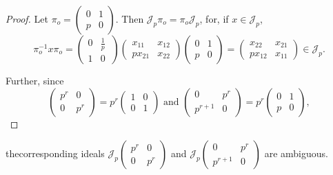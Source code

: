 \begin{proof}
  Let $\pi_o = \begin{pmatrix}0 & 1 \\ p & 0 \end{pmatrix} $. Then
  $\mathcal{J}_p \pi_o = \pi_o \mathcal{J}_p$, for, if $x \in
  \mathcal{J}_p$, 
  $$
  \pi^{-1}_o x \pi_o = \begin{pmatrix}  0 & \frac{1}{p} \\1&  0
    ~ \end{pmatrix} \begin{pmatrix} x_{11} & x_{12} \\ px_{21} &
    x_{22} \end{pmatrix} \begin{pmatrix} 0 & 1 \\ p & 0 \end{pmatrix}
  = \begin{pmatrix} x_{22} & x_{21} \\ px_{12}& x_{11} \end{pmatrix}
  \in \mathcal{J}_p. 
  $$
  
  Further, since
  $$
  \begin{pmatrix} p^r & 0 \\ 0 & p^r \end{pmatrix} =
  p^r \begin{pmatrix}1 & 0 \\ 0 & 1 \end{pmatrix} \text { and
  } \begin{pmatrix} 0& p^r \\ p^{r + 1} & 0  \end{pmatrix}  =
  p^r \begin{pmatrix} 0 & 1 \\  p & 0 \end{pmatrix}, 
  $$
\end{proof}
the\pageoriginale corresponding ideals $\mathcal{J}_p \begin{pmatrix} p^r & 0 \\ 0 &
  p^r \end{pmatrix} $ and $\mathcal{J}_p \begin{pmatrix} 0 & p^r
  \\  p^{r + 1} & 0 \end{pmatrix} $ are ambiguous. 

